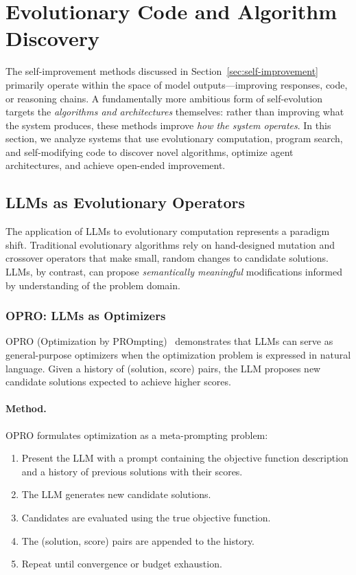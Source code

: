 \section{Evolutionary Code and Algorithm Discovery}
\label{sec:evolutionary-code}

The self-improvement methods discussed in Section~\ref{sec:self-improvement} primarily operate within the space of model outputs---improving responses, code, or reasoning chains. A fundamentally more ambitious form of self-evolution targets the \emph{algorithms and architectures} themselves: rather than improving what the system produces, these methods improve \emph{how the system operates}. In this section, we analyze systems that use evolutionary computation, program search, and self-modifying code to discover novel algorithms, optimize agent architectures, and achieve open-ended improvement.

\subsection{LLMs as Evolutionary Operators}
\label{sec:llm-evolutionary}

The application of LLMs to evolutionary computation represents a paradigm shift. Traditional evolutionary algorithms rely on hand-designed mutation and crossover operators that make small, random changes to candidate solutions. LLMs, by contrast, can propose \emph{semantically meaningful} modifications informed by understanding of the problem domain.

\subsubsection{OPRO: LLMs as Optimizers}
\label{sec:opro}

OPRO (Optimization by PROmpting)~\citep{yang2023opro} demonstrates that LLMs can serve as general-purpose optimizers when the optimization problem is expressed in natural language. Given a history of (solution, score) pairs, the LLM proposes new candidate solutions expected to achieve higher scores.

\paragraph{Method.}
OPRO formulates optimization as a meta-prompting problem:
\begin{enumerate}
    \item Present the LLM with a prompt containing the objective function description and a history of previous solutions with their scores.
    \item The LLM generates new candidate solutions.
    \item Candidates are evaluated using the true objective function.
    \item The (solution, score) pairs are appended to the history.
    \item Repeat until convergence or budget exhaustion.
\end{enumerate}

